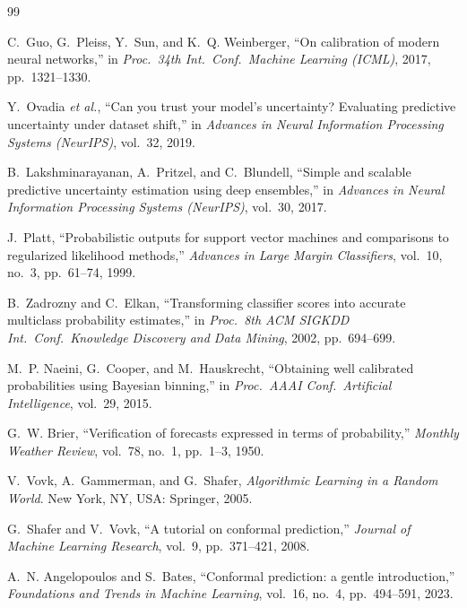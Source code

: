 \documentclass[11pt,a4paper]{article}
\begin{document}
\begin{thebibliography}{99}
\setlength{\itemsep}{1pt}

 C.~Guo, G.~Pleiss, Y.~Sun, and K.~Q. Weinberger, ``On calibration of
modern neural networks,'' in \emph{Proc.\ 34th Int.\ Conf.\ Machine Learning (ICML)},
2017, pp.\ 1321--1330.

 Y.~Ovadia \emph{et al.}, ``Can you trust your model's uncertainty?
Evaluating predictive uncertainty under dataset shift,'' in \emph{Advances in Neural
Information Processing Systems (NeurIPS)}, vol.\ 32, 2019.

 B.~Lakshminarayanan, A.~Pritzel, and C.~Blundell,
``Simple and scalable predictive uncertainty estimation using deep ensembles,'' in
\emph{Advances in Neural Information Processing Systems (NeurIPS)}, vol.\ 30, 2017.

 J.~Platt, ``Probabilistic outputs for support vector machines and
comparisons to regularized likelihood methods,'' \emph{Advances in Large Margin
Classifiers}, vol.\ 10, no.\ 3, pp.\ 61--74, 1999.

 B.~Zadrozny and C.~Elkan, ``Transforming classifier scores into
accurate multiclass probability estimates,'' in \emph{Proc.\ 8th ACM SIGKDD Int.\ Conf.\
Knowledge Discovery and Data Mining}, 2002, pp.\ 694--699.

 M.~P. Naeini, G.~Cooper, and M.~Hauskrecht, ``Obtaining well
calibrated probabilities using Bayesian binning,'' in \emph{Proc.\ AAAI Conf.\
Artificial Intelligence}, vol.\ 29, 2015.

 G.~W. Brier, ``Verification of forecasts expressed in terms of
probability,'' \emph{Monthly Weather Review}, vol.\ 78, no.\ 1, pp.\ 1--3, 1950.

\bibitem{vovk2005} V.~Vovk, A.~Gammerman, and G.~Shafer, \emph{Algorithmic Learning in
a Random World}. New York, NY, USA: Springer, 2005.

 G.~Shafer and V.~Vovk, ``A tutorial on conformal prediction,''
\emph{Journal of Machine Learning Research}, vol.\ 9, pp.\ 371--421, 2008.

\bibitem{angelopoulos2023} A.~N. Angelopoulos and S.~Bates, ``Conformal prediction: a
gentle introduction,'' \emph{Foundations and Trends in Machine Learning}, vol.\ 16,
no.\ 4, pp.\ 494--591, 2023.


\end{thebibliography}
\end{document}
